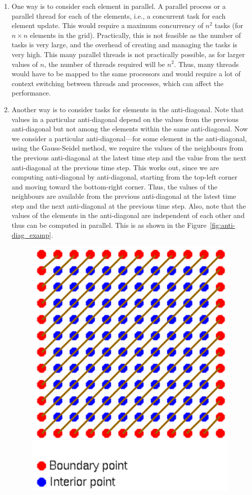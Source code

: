 \documentclass[12pt]{book}
\begin{document}
\begin{enumerate}
    \item One way is to consider each element in parallel. A parallel process or a parallel thread for each of the elements, i.e., a concurrent task for each element update. This would require a maximum concurrency of $n^2$ tasks (for $n \times n$ elements in the grid). Practically, this is not feasible as the number of tasks is very large, and the overhead of creating and managing the tasks is very high. This many parallel threads is not practically possible, as for larger values of $n$, the number of threads required will be $n^2$. Thus, many threads would have to be mapped to the same processors and would require a lot of context switching between threads and processes, which can affect the performance.

    \item Another way is to consider tasks for elements in the anti-diagonal. Note that values in a particular anti-diagonal depend on the values from the previous anti-diagonal but not among the elements within the same anti-diagonal. Now we consider a particular anti-diagonal—for some element in the anti-diagonal, using the Gauss-Seidel method, we require the values of the neighbours from the previous anti-diagonal at the latest time step and the value from the next anti-diagonal at the previous time step. This works out, since we are computing anti-diagonal by anti-diagonal, starting from the top-left corner and moving toward the bottom-right corner. Thus, the values of the neighbours are available from the previous anti-diagonal at the latest time step and the next anti-diagonal at the previous time step. Also, note that the values of the elements in the anti-diagonal are independent of each other and thus can be computed in parallel. This is as shown in the Figure~\ref{fig:anti-diag_examp}.
\begin{figure}[ht]
    \centering
    \includegraphics[width=0.5\linewidth]{images/Examp_anti2.png}

\end{figure}
\end{enumerate}
\end{document}
